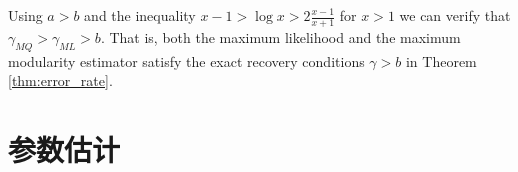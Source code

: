 Using $a>b$ and the inequality $x-1>\log x > 2 \frac{x-1}{x+1}$ for $x>1$ we can verify that $\gamma_{MQ} > \gamma_{ML} > b$. That is, both the maximum likelihood and the maximum modularity estimator satisfy the exact recovery conditions $\gamma > b $ in Theorem \ref{thm:error_rate}.

\section{参数估计}

